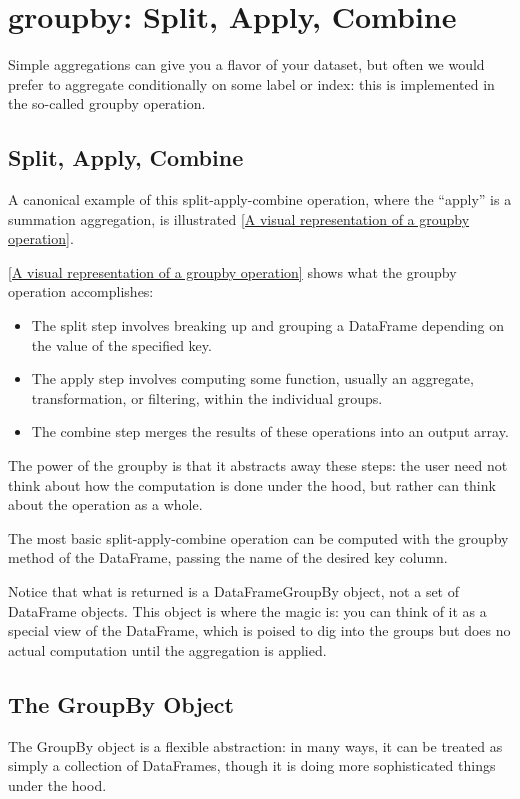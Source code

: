 \section{groupby: Split, Apply, Combine}
Simple aggregations can give you a flavor of your dataset, but often we would prefer
to aggregate conditionally on some label or index: this is implemented in the so-called groupby operation.
\subsection*{Split, Apply, Combine}
A canonical example of this split-apply-combine operation, where the “apply” is a summation aggregation, is illustrated \autoref{A visual representation of a groupby operation}.

\autoref{A visual representation of a groupby operation} shows what the groupby operation accomplishes:
\begin{itemize}
    \item The split step involves breaking up and grouping a DataFrame depending on the value of the specified key.
    \item The apply step involves computing some function, usually an aggregate, transformation, or filtering, within the individual groups.
    \item The combine step merges the results of these operations into an output array.
\end{itemize}


The power of the groupby is that it
abstracts away these steps: the user need not think about how the computation is
done under the hood, but rather can think about the operation as a whole.

The most basic split-apply-combine operation can be computed with the groupby
method of the DataFrame, passing the name of the desired key column.

Notice that what is returned is a DataFrameGroupBy object, not a set of DataFrame
objects. This object is where the magic is: you can think of it as a special view of the
DataFrame, which is poised to dig into the groups but does no actual computation
until the aggregation is applied.
\subsection*{The GroupBy Object}
The GroupBy object is a flexible abstraction: in many ways, it can be treated as simply
a collection of DataFrames, though it is doing more sophisticated things under the
hood.

